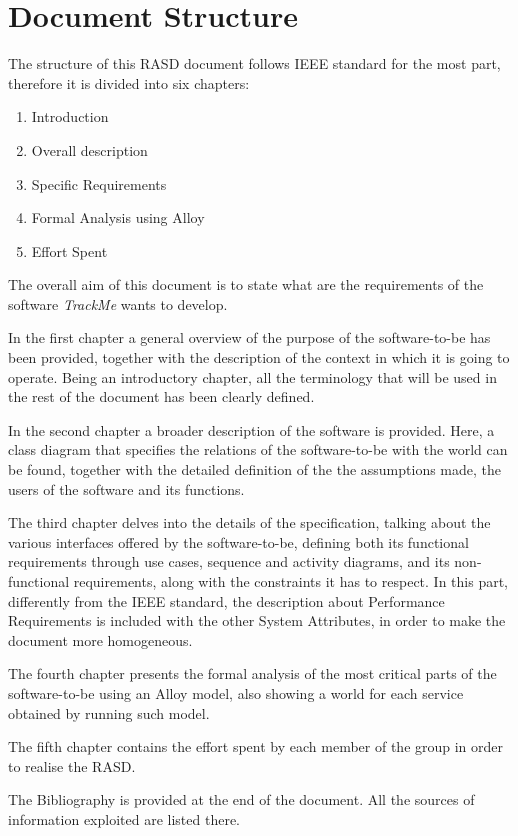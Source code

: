 \section{Document Structure}
    The structure of this RASD document follows IEEE standard for the most part, therefore it is divided into six chapters:
    \begin{enumerate}
        \item Introduction
        
        \item Overall description
        
        \item Specific Requirements
        
        \item Formal Analysis using Alloy
        
        \item Effort Spent
    \end{enumerate}
    
The overall aim of this document is to state what are the requirements of the software \emph{TrackMe} wants to develop.
    
    In the first chapter a general overview of the purpose of the software-to-be has been provided, together with the description of the context in which it is going to operate. Being an introductory chapter, all the terminology that will be used in the rest of the document has been clearly defined.
    
    In the second chapter a broader description of the software is provided. Here, a class diagram that specifies the relations of the software-to-be with the world can be found, together with the detailed definition of the the assumptions made, the users of the software and its functions.
    
    The third chapter delves into the details of the specification, talking about the various interfaces offered by the software-to-be, defining both its functional requirements through use cases, sequence and activity diagrams, and its non-functional requirements, along with the constraints it has to respect. In this part, differently from the IEEE standard, the description about Performance Requirements is included with the other System Attributes, in order to make the document more homogeneous.
    
    The fourth chapter presents the formal analysis of the most critical parts of the software-to-be using an Alloy model, also showing a world for each service obtained by running such model.
    
    The fifth chapter contains the effort spent by each member of the group in order to realise the RASD.
    
    The Bibliography is provided at the end of the document. All the sources of information exploited are listed there.